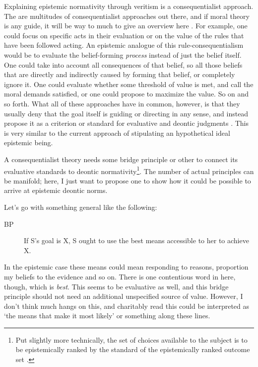 \documentclass[12pt,numbers=noenddot]{scrartcl}
\begin{document}
Explaining epistemic normativity through veritism is a consequentialist approach. The are multitudes of consequentialist approaches out there, and if moral theory is any guide, it will be way to much to give an overview here \autocite{sep-consequentialism}. For example, one could focus on specific acts in their evaluation or on the value of the rules that have been followed acting. An epistemic analogue of this rule-consequentialism would be to evaluate the belief-forming \emph{process} instead of just the belief itself. One could take into account all consequences of that belief, so all those beliefs that are directly and indirectly caused by forming that belief, or completely ignore it. One could evaluate whether some threshold of value is met, and call the moral demands satisfied, or one could propose to maximize the value. So on and so forth. What all of these approaches have in common, however, is that they usually deny that the goal itself is guiding or directing in any sense, and instead propose it as a criterion or standard for evaluative and deontic judgments \autocite[16]{sep-consequentialism}. This is very similar to the current approach of stipulating an hypothetical ideal epistemic being.

A consequentialist theory needs some bridge principle or other to connect its evaluative standards to deontic normativity\footnote{Put slightly more technically, the set of choices available to the subject is to be epistemically ranked by the standard of the epistemically ranked outcome set \autocite{adler_ranking_2011}.}. The number of actual principles can be manifold; here, I just want to propose one to show how it could be possible to arrive at epistemic deontic norms. 

Let's go with something general like the following:

\begin{description}
    \item[BP] If S's goal is X, S ought to use the best means accessible to her to achieve X.
\end{description}

In the epistemic case these means could mean responding to reasons, proportion my beliefs to the evidence and so on. There is one contentious word in here, though, which is \emph{best}. This seems to be evaluative as well, and this bridge principle should not need an additional unspecified source of value. However, I don't think much hangs on this, and charitably read this could be interpreted as ‘the means that make it most likely’ or something along these lines.
\end{document}
